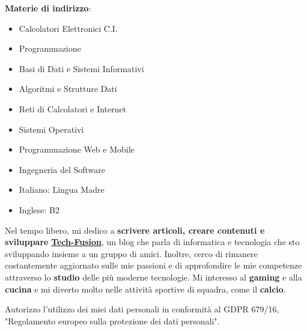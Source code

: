 

\textbf{Materie di indirizzo}: %
\begin{itemize}
    \item Calcolatori Elettronici C.I.
    \item Programmazione
    \item Basi di Dati e Sistemi Informativi
    \item Algoritmi e Strutture Dati
    \item Reti di Calcolatori e Internet
    \item Sistemi Operativi
    \item Programmazione Web e Mobile
    \item Ingegneria del Software
\end{itemize}

\begin{itemize}
    \item Italiano: Lingua Madre
    \item Inglese: B2
\end{itemize}




Nel tempo libero, mi dedico a \textbf{scrivere articoli, creare contenuti e sviluppare} \href{https://tech-fusion.it/}{\textbf{Tech-Fusion}}, un blog che parla di informatica e tecnologia che sto sviluppando insieme a un gruppo di amici. Inoltre, cerco di rimanere costantemente aggiornato sulle mie passioni e di approfondire le mie competenze attraverso lo \textbf{studio} delle più moderne tecnologie. Mi interesso al \textbf{gaming} e alla \textbf{cucina} e mi diverto molto nelle attività sportive di squadra, come il \textbf{calcio}.



\divider

\footnotesize{Autorizzo l'utilizzo dei miei dati personali in conformità al GDPR 679/16, "Regolamento europeo sulla protezione dei dati personali".}

